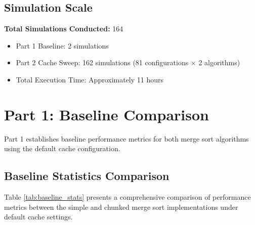 \documentclass[12pt,a4paper]{article}
\begin{document}
\subsection{Simulation Scale}

\textbf{Total Simulations Conducted:} 164
\begin{itemize}
    \item Part 1 Baseline: 2 simulations
    \item Part 2 Cache Sweep: 162 simulations (81 configurations $\times$ 2 algorithms)
    \item Total Execution Time: Approximately 11 hours
\end{itemize}

\newpage
\section{Part 1: Baseline Comparison}

Part 1 establishes baseline performance metrics for both merge sort algorithms using the default cache configuration. 

\subsection{Baseline Statistics Comparison}

Table \ref{tab:baseline_stats} presents a comprehensive comparison of performance metrics between the simple and chunked merge sort implementations under default cache settings.
\end{document}
